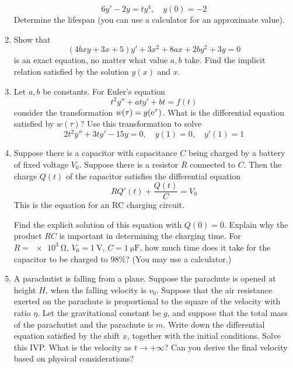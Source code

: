 \documentclass[../psets.tex]{subfiles}
\begin{document}
\begin{enumerate}
\begin{equation*}
        6y'-2y = ty^4
        ,\quad
        y(0) = -2
    \end{equation*}
    Determine the lifespan (you can use a calculator for an approximate value).
    \item Show that
    \begin{equation*}
        (4bxy+3x+5)y'+3x^2+8ax+2by^2+3y = 0
    \end{equation*}
    is an exact equation, no matter what value $a,b$ take. Find the implicit relation satisfied by the solution $y(x)$ and $x$.
    \item Let $a,b$ be constants. For Euler's equation
    \begin{equation*}
        t^2y''+aty'+bt = f(t)
    \end{equation*}
    consider the transformation $w(\tau)=y(\e[\tau])$. What is the differential equation satisfied by $w(\tau)$? Use this transformation to solve
    \begin{equation*}
        2t^2y''+3ty'-15y=0
        ,\quad
        y(1) = 0
        ,\quad
        y'(1) = 1
    \end{equation*}
    \item Suppose there is a capacitor with capacitance $C$ being charged by a battery of fixed voltage $V_0$. Suppose there is a resistor $R$ connected to $C$. Then the charge $Q(t)$ of the capacitor satisfies the differential equation
    \begin{equation*}
        RQ'(t)+\frac{Q(t)}{C} = V_0
    \end{equation*}
    This is the equation for an RC charging circuit.\par
    Find the explicit solution of this equation with $Q(0)=0$. Explain why the product $RC$ is important in determining the charging time. For $R=\SI{e3}{\ohm}$, $V_0=\SI{1}{\volt}$, $C=\SI{1}{\micro\farad}$, how much time does it take for the capacitor to be charged to 98\%? (You may use a calculator.)
    \item A parachutist is falling from a plane. Suppose the parachute is opened at height $H$, when the falling velocity is $v_0$. Suppose that the air resistance exerted on the parachute is proportional to the square of the velocity with ratio $\eta$. Let the gravitational constant be $g$, and suppose that the total mass of the parachutist and the parachute is $m$. Write down the differential equation satisfied by the shift $x$, together with the initial conditions. Solve this IVP. What is the velocity as $t\to +\infty$? Can you derive the final velocity based on physical considerations?
\end{enumerate}
\end{document}
